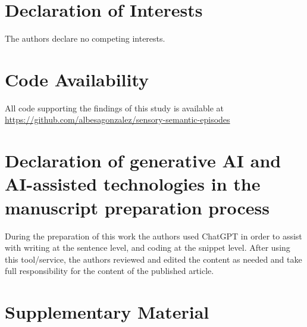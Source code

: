 \documentclass{article}
\providecommand{\DIFdelbegin}{} %
\begin{document}
\section*{Declaration of Interests}
The authors declare no competing interests.
\section*{Code Availability}
All code supporting the findings of this study is available at 
\url{https://github.com/albesagonzalez/sensory-semantic-episodes}
\section*{Declaration of generative AI and AI-assisted technologies in the manuscript preparation process}
During the preparation of this work the authors used ChatGPT in order to assist with writing at the sentence level, and coding at the snippet level. After using this tool/service, the authors reviewed and edited the content as needed and take full responsibility for the content of the published article.

\clearpage
\section*{Supplementary Material}
\renewcommand{\thefigure}{S\arabic{figure}}
\setcounter{figure}{0} %
\DIFdelbegin %
\end{document}
